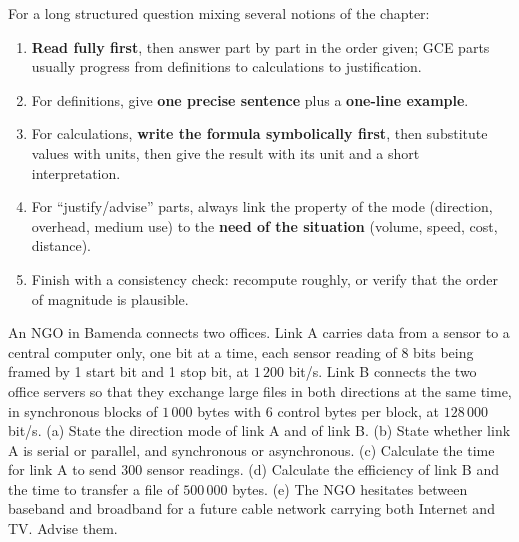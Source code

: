 \documentclass[11pt]{article}
\begin{document}
\begin{methode}
For a long structured question mixing several notions of the chapter:
\begin{enumerate}
\item \textbf{Read fully first}, then answer part by part in the order given; GCE parts usually progress from definitions to calculations to justification.
\item For definitions, give \textbf{one precise sentence} plus a \textbf{one-line example}.
\item For calculations, \textbf{write the formula symbolically first}, then substitute values with units, then give the result with its unit and a short interpretation.
\item For ``justify/advise'' parts, always link the property of the mode (direction, overhead, medium use) to the \textbf{need of the situation} (volume, speed, cost, distance).
\item Finish with a consistency check: recompute roughly, or verify that the order of magnitude is plausible.
\end{enumerate}
\end{methode}

\begin{experience}
An NGO in Bamenda connects two offices. Link A carries data from a sensor to a central computer only, one bit at a time, each sensor reading of 8 bits being framed by 1 start bit and 1 stop bit, at $1\,200$ bit/s. Link B connects the two office servers so that they exchange large files in both directions at the same time, in synchronous blocks of $1\,000$ bytes with 6 control bytes per block, at $128\,000$ bit/s.
(a) State the direction mode of link A and of link B. (b) State whether link A is serial or parallel, and synchronous or asynchronous. (c) Calculate the time for link A to send 300 sensor readings. (d) Calculate the efficiency of link B and the time to transfer a file of $500\,000$ bytes. (e) The NGO hesitates between baseband and broadband for a future cable network carrying both Internet and TV. Advise them.
\end{experience}
\end{document}

